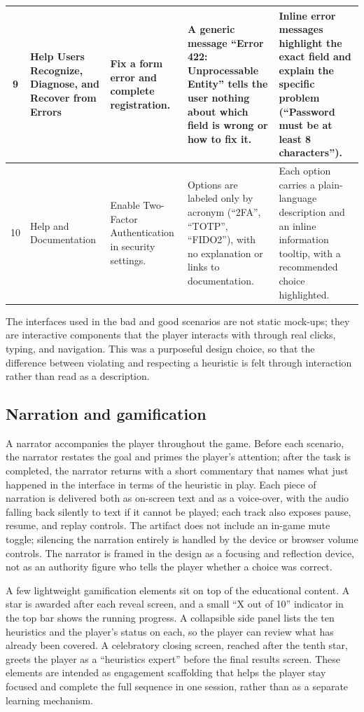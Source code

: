 {\begin{longtable}[c]{c|p{2.3cm}|p{2.5cm}|p{4.0cm}|p{4.0cm}}
  \hline
  9 & Help Users Recognize, Diagnose, and Recover from Errors & Fix a form error and complete registration. & A generic message ``Error 422: Unprocessable Entity'' tells the user nothing about which field is wrong or how to fix it. & Inline error messages highlight the exact field and explain the specific problem (``Password must be at least 8 characters''). \\
  \hline
  10 & Help and Documentation & Enable Two-Factor Authentication in security settings. & Options are labeled only by acronym (``2FA'', ``TOTP'', ``FIDO2''), with no explanation or links to documentation. & Each option carries a plain-language description and an inline information tooltip, with a recommended choice highlighted. \\
\end{longtable}
}

The interfaces used in the bad and good scenarios are not static mock-ups; they are interactive components that the player interacts with through real clicks, typing, and navigation. This was a purposeful design choice, so that the difference between violating and respecting a heuristic is felt through interaction rather than read as a description.

\subsection{Narration and gamification}

A narrator accompanies the player throughout the game. Before each scenario, the narrator restates the goal and primes the player's attention; after the task is completed, the narrator returns with a short commentary that names what just happened in the interface in terms of the heuristic in play. Each piece of narration is delivered both as on-screen text and as a voice-over, with the audio falling back silently to text if it cannot be played; each track also exposes pause, resume, and replay controls. The artifact does not include an in-game mute toggle; silencing the narration entirely is handled by the device or browser volume controls. The narrator is framed in the design as a focusing and reflection device, not as an authority figure who tells the player whether a choice was correct.

A few lightweight gamification elements sit on top of the educational content. A star is awarded after each reveal screen, and a small ``X out of 10'' indicator in the top bar shows the running progress. A collapsible side panel lists the ten heuristics and the player's status on each, so the player can review what has already been covered. A celebratory closing screen, reached after the tenth star, greets the player as a ``heuristics expert'' before the final results screen. These elements are intended as engagement scaffolding that helps the player stay focused and complete the full sequence in one session, rather than as a separate learning mechanism.

